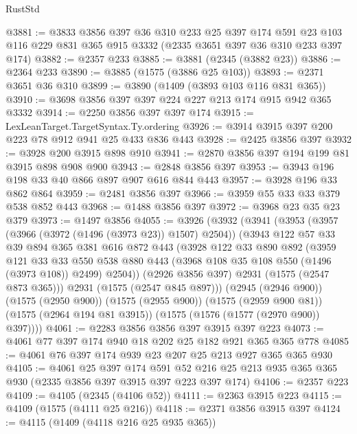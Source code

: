 \begin{lexlean}{RustStd}
\begin{coremodule}
@3881 := @3833
    @3856
    @397
    @36
    @310
    @233
    @25
    @397
    @174
    @591
    @23
    @103
    @116
    @229
    @831
    @365
    @915
    @3332
    (@2335 @3651 @397 @36 @310 @233 @397 @174)
@3882 := @2357 @233
@3885 := @3881 (@2345 (@3882 @23))
@3886 := @2364 @233
@3890 := @3885 (@1575 (@3886 @25 @103))
@3893 := @2371 @3651 @36 @310
@3899 := @3890 (@1409 (@3893 @103 @116 @831 @365))
@3910 := @3698 @3856 @397 @397 @224 @227 @213 @174 @915 @942 @365 @3332
@3914 := @2250 @3856 @397 @397 @174
@3915 := LexLeanTarget.TargetSyntax.Ty.ordering
@3926 := @3914 @3915 @397 @200 @223 @78 @912 @941 @25 @433 @836 @443
@3928 := @2425 @3856 @397
@3932 := @3928 @200 @3915 @898 @910
@3941 := @2870 @3856 @397 @194 @199 @81 @3915 @898 @908 @900
@3943 := @2848 @3856 @397
@3953 := @3943 @196 @198 @33 @40 @866 @897 @907 @616 @844 @443
@3957 := @3928 @196 @33 @862 @864
@3959 := @2481 @3856 @397
@3966 := @3959 @55 @33 @33 @379 @538 @852 @443
@3968 := @1488 @3856 @397
@3972 := @3968 @23 @35 @23 @379
@3973 := @1497 @3856
@4055 := @3926
    (@3932
      (@3941
        (@3953
          (@3957 (@3966 (@3972 (@1496 (@3973 @23)) @1507) @2504))
          (@3943
            @122
            @57
            @33
            @39
            @894
            @365
            @381
            @616
            @872
            @443
            (@3928
              @122
              @33
              @890
              @892
              (@3959
                @121
                @33
                @33
                @550
                @538
                @880
                @443
                (@3968 @108 @35 @108 @550 (@1496 (@3973 @108)) @2499)
                @2504))
            (@2926 @3856 @397)
            @2931
            (@1575 (@2547 @873 @365)))
          @2931
          (@1575 (@2547 @845 @897)))
        (@2945 (@2946 @900))
        (@1575 (@2950 @900))
        (@1575 (@2955 @900))
        (@1575 (@2959 @900 @81))
        (@1575 (@2964 @194 @81 @3915))
        (@1575 (@1576 (@1577 (@2970 @900)) @397))))
@4061 := @2283 @3856 @3856 @397 @3915 @397 @223
@4073 := @4061 @77 @397 @174 @940 @18 @202 @25 @182 @921 @365 @365 @778
@4085 := @4061 @76 @397 @174 @939 @23 @207 @25 @213 @927 @365 @365 @930
@4105 := @4061
    @25
    @397
    @174
    @591
    @52
    @216
    @25
    @213
    @935
    @365
    @365
    @930
    (@2335 @3856 @397 @3915 @397 @223 @397 @174)
@4106 := @2357 @223
@4109 := @4105 (@2345 (@4106 @52))
@4111 := @2363 @3915 @223
@4115 := @4109 (@1575 (@4111 @25 @216))
@4118 := @2371 @3856 @3915 @397
@4124 := @4115 (@1409 (@4118 @216 @25 @935 @365))

\end{coremodule}
\end{lexlean}
